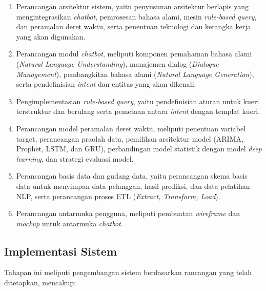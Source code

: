 \begin{enumerate}[label=\alph*.]
  \item Perancangan arsitektur sistem, yaitu penyusunan arsitektur berlapis yang mengintegrasikan \textit{chatbot}, pemrosesan bahasa alami, mesin \textit{rule-based query}, dan peramalan deret waktu, serta penentuan teknologi dan kerangka kerja yang akan digunakan.
  
  \item Perancangan modul \textit{chatbot}, meliputi komponen pemahaman bahasa alami (\textit{Natural Language Understanding}), manajemen dialog (\textit{Dialogue Management}), pembangkitan bahasa alami (\textit{Natural Language Generation}), serta pendefinisian \textit{intent} dan entitas yang akan dikenali.
  
  \item Pengimplementasian \textit{rule-based query}, yaitu pendefinisian aturan untuk kueri terstruktur dan berulang serta pemetaan antara \textit{intent} dengan templat kueri.
  
  \item Perancangan model peramalan deret waktu, meliputi penentuan variabel target, perancangan praolah data, pemilihan arsitektur model (ARIMA, Prophet, LSTM, dan GRU), perbandingan model statistik dengan model \textit{deep learning}, dan strategi evaluasi model.
  
  \item Perancangan basis data dan gudang data, yaitu perancangan skema basis data untuk menyimpan data pelanggan, hasil prediksi, dan data pelatihan NLP, serta perancangan proses ETL\label{abbr:ETL} (\textit{Extract, Transform, Load}).
  
  \item Perancangan antarmuka pengguna, meliputi pembuatan \textit{wireframe} dan \textit{mockup} untuk antarmuka \textit{chatbot}.
\end{enumerate}

\subsection{Implementasi Sistem}

Tahapan ini meliputi pengembangan sistem berdasarkan rancangan yang telah ditetapkan, mencakup:

